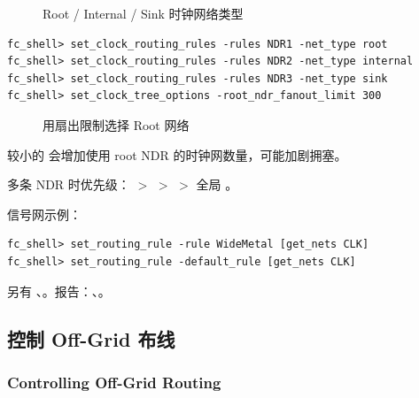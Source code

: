 \begin{figure}[htbp]
\centering
{}
\caption{Root / Internal / Sink 时钟网络类型}
\label{fig:clock-net-types}
\end{figure}

\begin{lstlisting}
fc_shell> set_clock_routing_rules -rules NDR1 -net_type root
fc_shell> set_clock_routing_rules -rules NDR2 -net_type internal
fc_shell> set_clock_routing_rules -rules NDR3 -net_type sink
fc_shell> set_clock_tree_options -root_ndr_fanout_limit 300
\end{lstlisting}

\begin{figure}[htbp]
\centering
{}
\caption{用扇出限制选择 Root 网络}
\label{fig:root-fanout-limit}
\end{figure}

\begin{noteBox}
较小的  会增加使用 root NDR 的时钟网数量，可能加剧拥塞。
\end{noteBox}

多条 NDR 时优先级： $>$  $>$  $>$ 全局 。

信号网示例：
\begin{lstlisting}
fc_shell> set_routing_rule -rule WideMetal [get_nets CLK]
fc_shell> set_routing_rule -default_rule [get_nets CLK]
\end{lstlisting}
另有 、。报告：、。

\subsection{控制 Off-Grid 布线}
\subsubsection*{Controlling Off-Grid Routing}

